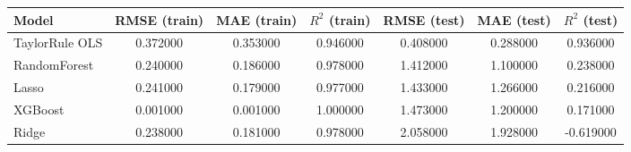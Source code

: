 \begin{tabular}{lcccccc}
\toprule
Model & RMSE (train) & MAE (train) & $R^2$ (train) & RMSE (test) & MAE (test) & $R^2$ (test) \\
\midrule
TaylorRule OLS & 0.372000 & 0.353000 & 0.946000 & 0.408000 & 0.288000 & 0.936000 \\
RandomForest & 0.240000 & 0.186000 & 0.978000 & 1.412000 & 1.100000 & 0.238000 \\
Lasso & 0.241000 & 0.179000 & 0.977000 & 1.433000 & 1.266000 & 0.216000 \\
XGBoost & 0.001000 & 0.001000 & 1.000000 & 1.473000 & 1.200000 & 0.171000 \\
Ridge & 0.238000 & 0.181000 & 0.978000 & 2.058000 & 1.928000 & -0.619000 \\
\bottomrule
\end{tabular}
